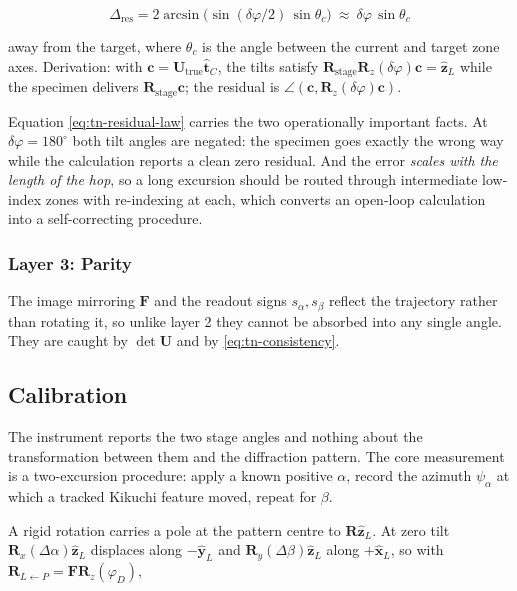 \begin{equation}
\Delta_{\text{res}} = 2\arcsin\!\bigl(\sin(\delta\varphi/2)\,\sin\theta_c\bigr)
\ \approx\ \delta\varphi\,\sin\theta_c
\label{eq:tn-residual-law}
\end{equation}

away from the target, where $\theta_c$ is the angle between the current and target zone axes.
Derivation: with $\mathbf{c} = \mathbf{U}_{\text{true}}\hat{\mathbf{t}}_C$, the tilts satisfy
$\mathbf{R}_{\text{stage}}\mathbf{R}_z(\delta\varphi)\mathbf{c} = \hat{\mathbf{z}}_L$ while the
specimen delivers $\mathbf{R}_{\text{stage}}\mathbf{c}$; the residual is
$\angle(\mathbf{c}, \mathbf{R}_z(\delta\varphi)\mathbf{c})$.

Equation \eqref{eq:tn-residual-law} carries the two operationally important facts. At
$\delta\varphi = 180^{\circ}$ both tilt angles are negated: the specimen goes exactly the wrong way
while the calculation reports a clean zero residual. And the error \emph{scales with the length of
the hop}, so a long excursion should be routed through intermediate low-index zones with
re-indexing at each, which converts an open-loop calculation into a self-correcting procedure.

\subsubsection{Layer 3: Parity}

The image mirroring $\mathbf{F}$ and the readout signs $s_\alpha, s_\beta$ reflect the trajectory
rather than rotating it, so unlike layer 2 they cannot be absorbed into any single angle. They are
caught by $\det\mathbf{U}$ and by \eqref{eq:tn-consistency}.

\subsection{Calibration}

The instrument reports the two stage angles and nothing about the transformation between them and
the diffraction pattern. The core measurement is a two-excursion procedure: apply a known positive
$\alpha$, record the azimuth $\psi_\alpha$ at which a tracked Kikuchi feature moved, repeat for
$\beta$.

A rigid rotation carries a pole at the pattern centre to $\mathbf{R}\hat{\mathbf{z}}_L$. At zero
tilt $\mathbf{R}_x(\Delta\alpha)\hat{\mathbf{z}}_L$ displaces along $-\hat{\mathbf{y}}_L$ and
$\mathbf{R}_y(\Delta\beta)\hat{\mathbf{z}}_L$ along $+\hat{\mathbf{x}}_L$, so with
$\mathbf{R}_{L \leftarrow P} = \mathbf{F}\mathbf{R}_z(\varphi_D)$,

